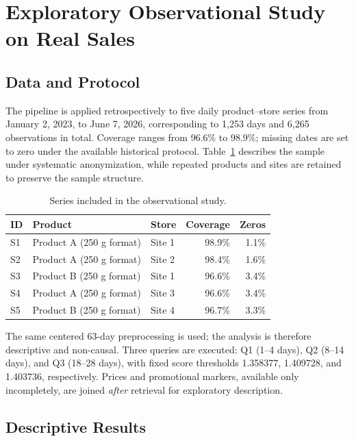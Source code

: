 \documentclass[11pt,a4paper]{article}
\begin{document}
\section{Exploratory Observational Study on Real Sales}

\subsection{Data and Protocol}

The pipeline is applied retrospectively to five daily product--store series from January 2, 2023, to June 7, 2026, corresponding to 1,253 days and 6,265 observations in total. Coverage ranges from 96.6\% to 98.9\%; missing dates are set to zero under the available historical protocol. Table~\ref{tab:real-series} describes the sample under systematic anonymization, while repeated products and sites are retained to preserve the sample structure.

\begin{table}[H]
\centering
\caption{Series included in the observational study.}
\label{tab:real-series}
\small
\begin{tabularx}{\textwidth}{@{}lXlrr@{}}
\toprule
ID & Product & Store & Coverage & Zeros \\
\midrule
S1 & Product A (250 g format) & Site 1 & 98.9\% & 1.1\% \\
S2 & Product A (250 g format) & Site 2 & 98.4\% & 1.6\% \\
S3 & Product B (250 g format) & Site 1 & 96.6\% & 3.4\% \\
S4 & Product A (250 g format) & Site 3 & 96.6\% & 3.4\% \\
S5 & Product B (250 g format) & Site 4 & 96.7\% & 3.3\% \\
\bottomrule
\end{tabularx}
\end{table}

The same centered 63-day preprocessing is used; the analysis is therefore descriptive and non-causal. Three queries are executed: Q1 (1--4 days), Q2 (8--14 days), and Q3 (18--28 days), with fixed score thresholds 1.358377, 1.409728, and 1.403736, respectively. Prices and promotional markers, available only incompletely, are joined \emph{after} retrieval for exploratory description.

\subsection{Descriptive Results}
\end{document}
